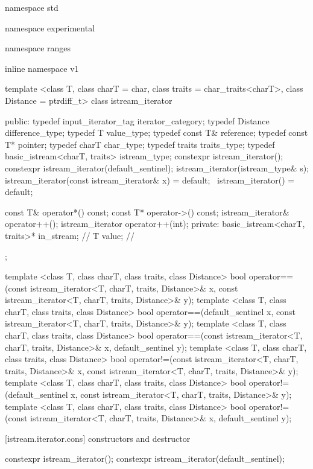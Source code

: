 \begin{codeblock}
namespace std { namespace experimental { namespace ranges { inline namespace v1 {
  template <class T, class charT = char, class traits = char_traits<charT>,
      class Distance = ptrdiff_t>
  class istream_iterator {
  public:
    typedef input_iterator_tag iterator_category;
    typedef Distance difference_type;
    typedef T value_type;
    typedef const T& reference;
    typedef const T* pointer;
    typedef charT char_type;
    typedef traits traits_type;
    typedef basic_istream<charT, traits> istream_type;
    constexpr istream_iterator();
    constexpr istream_iterator(default_sentinel);
    istream_iterator(istream_type& s);
    istream_iterator(const istream_iterator& x) = default;
    ~istream_iterator() = default;

    const T& operator*() const;
    const T* operator->() const;
    istream_iterator& operator++();
    istream_iterator  operator++(int);
  private:
    basic_istream<charT, traits>* in_stream; // \expos
    T value;                                 // \expos
  };

  template <class T, class charT, class traits, class Distance>
    bool operator==(const istream_iterator<T, charT, traits, Distance>& x,
            const istream_iterator<T, charT, traits, Distance>& y);
  template <class T, class charT, class traits, class Distance>
    bool operator==(default_sentinel x,
            const istream_iterator<T, charT, traits, Distance>& y);
  template <class T, class charT, class traits, class Distance>
    bool operator==(const istream_iterator<T, charT, traits, Distance>& x,
            default_sentinel y);
  template <class T, class charT, class traits, class Distance>
    bool operator!=(const istream_iterator<T, charT, traits, Distance>& x,
            const istream_iterator<T, charT, traits, Distance>& y);
  template <class T, class charT, class traits, class Distance>
    bool operator!=(default_sentinel x,
            const istream_iterator<T, charT, traits, Distance>& y);
  template <class T, class charT, class traits, class Distance>
    bool operator!=(const istream_iterator<T, charT, traits, Distance>& x,
            default_sentinel y);
}}}}
\end{codeblock}

[istream.iterator.cons]{ constructors and destructor}

%
\begin{itemdecl}
constexpr istream_iterator();
constexpr istream_iterator(default_sentinel);
\end{itemdecl}

